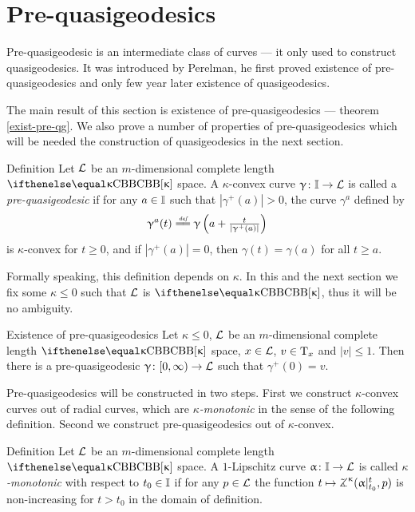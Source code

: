 \section{Pre-quasigeodesics}
\label{sec:pqg}

Pre-quasigeodesic is an  intermediate class of curves --- it only used to construct quasigeodesics.
It was introduced by Perelman, 
he first proved existence of pre-quasigeodesics 
and only few year later existence of quasigeodesics.

The main result of this section is existence of pre-quasigeodesics --- theorem \ref{exist-pre-qg}.
We also prove a number of properties of pre-quasigeodesics which will be needed the construction of quasigeodesics in the next section.

\begin{thm}{Definition}\label{def:pqg}
Let  $\mathcal{L}$ be an $m$-dimensional complete length $\Alex{\kappa}$ space.
A $\kappa$-convex curve $\gamma\:\II \to \spc{L}$ is called a \emph{pre-quasigeodesic} if for
any $a\in \II$ such that ${|\gamma^+(a)|}>0$, the curve $\gamma^a$ defined by
\[\gamma^a(t)
\df
\gamma\left(a+\tfrac{t}{|\gamma^+(a)|}\right)\]
is $\kappa$-convex for $t\ge0$, and if ${|\gamma^+(a)|}=0$, then $\gamma(t)=\gamma(a)$ for
all $t\ge a$.
\end{thm}

Formally speaking, this definition depends on $\kappa$.
In this and the next section we fix some $\kappa\le 0$ such that $\mathcal{L}$ is $\Alex\kappa$, thus it will be no ambiguity.


\begin{thm}{Existence of pre-quasigeodesics}\label{exist-pre-qg}
Let $\kappa\le 0$, 
$\mathcal{L}$ be an $m$-dimensional complete length $\Alex{\kappa}$ space, 
$x\in \spc{L}$,
$v\in \T_x$ and $|v|\le 1$. 
Then there is a pre-quasigeodesic $\gamma\:[0,\infty)\to \spc{L}$ such that
 $\gamma^+(0)=v$.
\end{thm}

Pre-quasigeodesics will be constructed in two steps. 
First we construct $\kappa$-convex curves out of radial curves, which are \emph{$\kappa$-monotonic} in the sense of the following definition.
Second we construct pre-quasigeodesics out of $\kappa$-convex.

\begin{thm}{Definition}\label{def:mono}
Let $\mathcal{L}$ be an $m$-dimensional complete length $\Alex\kappa$ space.
A $1$-Lipschitz curve $\alpha\:\II\to \spc{L}$ is called \emph{$\kappa$-monotonic} with
respect to $t_0\in\II$ if for any $p\in \spc{L}$ the function $t\mapsto\tangle\mc\kappa(\alpha|_{t_0}^t,p)$
is non-increasing for $t>t_0$ in the domain of definition. 
\end{thm}



